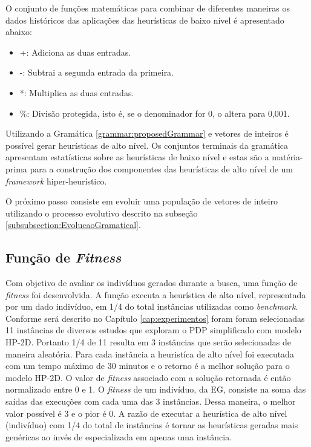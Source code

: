  
  
  O conjunto de funções matemáticas para combinar de diferentes maneiras os dados históricos das aplicações das heurísticas de baixo nível é apresentado abaixo:
  
  \begin{itemize}
  	\item +: Adiciona as duas entradas.
  	\item -: Subtrai a segunda entrada da primeira.
  	\item *: Multiplica as duas entradas.
  	\item \%: Divisão protegida, isto é, se o denominador for 0, o altera para 0,001.
  \end{itemize}
  
  
  Utilizando a Gramática \ref{grammar:proposedGrammar} e vetores de inteiros é possível gerar heurísticas de alto nível. Os conjuntos terminais da gramática apresentam estatísticas sobre as heurísticas de baixo nível e estas são a matéria-prima para a construção dos componentes das heurísticas de alto nível de um \textit{framework} hiper-heurístico. 
  
  

  
  O próximo passo consiste em evoluir uma população de vetores de inteiro utilizando o processo evolutivo descrito na subseção 
  \ref{subsubsection:EvolucaoGramatical}. %
  
  
  \subsection{Função de \textit{Fitness}}
  \label{sub:funcfitness}
  
  
  	
 Com objetivo de avaliar os indivíduos gerados durante a busca, uma função de \textit{fitness} foi desenvolvida. A função executa a heurística de alto nível, representada por um dado indivíduo, 
 em 1/4 do total instâncias utilizadas como \textit{benchmark}. Conforme será descrito no Capítulo \ref{cap:experimentos} foram   foram selecionadas 11 instâncias de diversos estudos que exploram o PDP simplificado com modelo HP-2D. Portanto 1/4 de 11 resulta em 3 instâncias que serão selecionadas de maneira aleatória. Para cada instância a heuristíca de alto nível foi executada com um tempo máximo de 30 minutos e o retorno é a melhor solução para o modelo HP-2D. O valor de \textit{fitness} associado com a solução retornada é então normalizado entre 0 e 1. O \textit{fitness} de um indivíduo, da EG, consiste na soma das saídas das execuções com cada uma das 3 instâncias. Dessa maneira, o melhor valor possível é 3 e o pior é 0. A razão de executar a heurística de alto nível (indivíduo) com 1/4 do total de instâncias é tornar as heurísticas geradas mais genéricas ao invés de especializada em apenas uma instância. 
  
